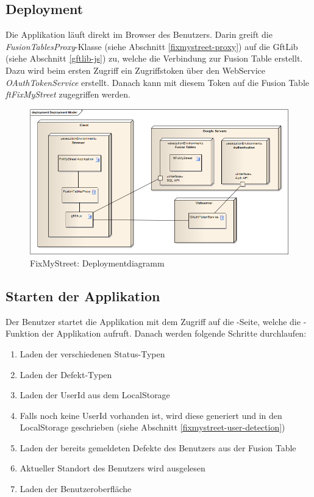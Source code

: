 \subsection{Deployment}
Die Applikation läuft direkt im Browser des Benutzers. Darin greift die \emph{FusionTablesProxy}-Klasse (siehe Abschnitt \ref{fixmystreet-proxy}) auf die GftLib (siehe Abschnitt \ref{gftlib-js}) zu, welche die Verbindung zur Fusion Table erstellt. Dazu wird beim ersten Zugriff ein Zugriffstoken über den WebService \emph{OAuthTokenService} erstellt. Danach kann mit diesem Token auf die Fusion Table \emph{ftFixMyStreet} zugegriffen werden.

\begin{figure}[H]
	\centering
	\includegraphics[width=\textwidth]{images/usecase2-fixmystreet/uml/fixmystreet-deploymentmodel}
	\caption{FixMyStreet: Deploymentdiagramm}
	\label{fixmystreet-deploymentmodel}
\end{figure}

\subsection{Starten der Applikation}
Der Benutzer startet die Applikation mit dem Zugriff auf die -Seite, welche die -Funktion der Applikation aufruft. Danach werden folgende Schritte durchlaufen:

\begin{enumerate}
\item Laden der verschiedenen Status-Typen
\item Laden der Defekt-Typen
\item Laden der UserId aus dem LocalStorage
\item Falls noch keine UserId vorhanden ist, wird diese generiert und in den LocalStorage geschrieben (siehe Abschnitt \ref{fixmystreet-user-detection})
\item Laden der bereits gemeldeten Defekte des Benutzers aus der Fusion Table
\item Aktueller Standort des Benutzers wird ausgelesen
\item Laden der Benutzeroberfläche
\end{enumerate}

